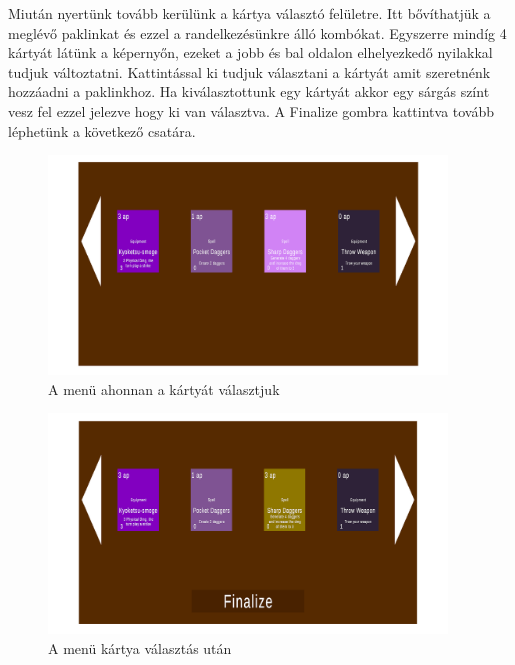 Miután nyertünk tovább kerülünk a kártya választó felületre. Itt bővíthatjük a meglévő paklinkat és ezzel a randelkezésünkre álló kombókat. Egyszerre mindíg 4 kártyát látünk a képernyőn, ezeket a jobb és bal oldalon elhelyezkedő nyilakkal tudjuk változtatni. Kattintással ki tudjuk választani a kártyát amit szeretnénk hozzáadni a paklinkhoz. Ha kiválasztottunk egy kártyát akkor egy sárgás színt vesz fel ezzel jelezve hogy ki van választva. A Finalize gombra kattintva tovább léphetünk a következő csatára.

\begin{figure}[h]
        \centering
        \includegraphics[width=400px,keepaspectratio]{images/chooseCard.png}
        \caption {A menü ahonnan a kártyát választjuk}
        \label{Choose}
    \hspace{1em}
\end{figure}

\begin{figure}[h]
        \centering
        \includegraphics[width=400px,keepaspectratio]{images/cardChoosen.png}
        \caption {A menü kártya választás után}
        \label{Chosen}
    \hspace{1em}
\end{figure}
